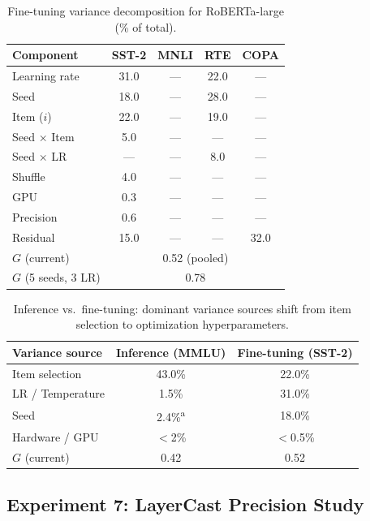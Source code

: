 \documentclass[11pt]{article}
\newcommand{\gcoeff}{G}
\begin{document}
\begin{table}[t]
\centering
\caption{Fine-tuning variance decomposition for RoBERTa-large (\% of total).}
\label{tab:finetune}
\begin{tabular}{lcccc}
\toprule
\textbf{Component} & \textbf{SST-2} & \textbf{MNLI} & \textbf{RTE} & \textbf{COPA} \\
\midrule
Learning rate & 31.0 & --- & 22.0 & --- \\
Seed & 18.0 & --- & 28.0 & --- \\
Item ($i$) & 22.0 & --- & 19.0 & --- \\
Seed $\times$ Item & 5.0 & --- & --- & --- \\
Seed $\times$ LR & --- & --- & 8.0 & --- \\
Shuffle & 4.0 & --- & --- & --- \\
GPU & 0.3 & --- & --- & --- \\
Precision & 0.6 & --- & --- & --- \\
Residual & 15.0 & --- & --- & 32.0\tnote{$\dagger$} \\
\midrule
$\gcoeff$ (current) & \multicolumn{4}{c}{0.52 (pooled)} \\
$\gcoeff$ (5 seeds, 3 LR) & \multicolumn{4}{c}{0.78} \\
\bottomrule
\end{tabular}
\end{table}

\begin{table}[t]
\centering
\caption{Inference vs.\ fine-tuning: dominant variance sources shift from item selection to optimization hyperparameters.}
\label{tab:infer_vs_finetune}
\begin{tabular}{lcc}
\toprule
\textbf{Variance source} & \textbf{Inference (MMLU)} & \textbf{Fine-tuning (SST-2)} \\
\midrule
Item selection & 43.0\% & 22.0\% \\
LR / Temperature & 1.5\% & 31.0\% \\
Seed & 2.4\%\textsuperscript{a} & 18.0\% \\
Hardware / GPU & $<$2\% & $<$0.5\% \\
\midrule
$\gcoeff$ (current) & 0.42 & 0.52 \\
\bottomrule
\end{tabular}
\end{table}

\subsection{Experiment 7: LayerCast Precision Study}
\label{sec:exp7}
\end{document}
